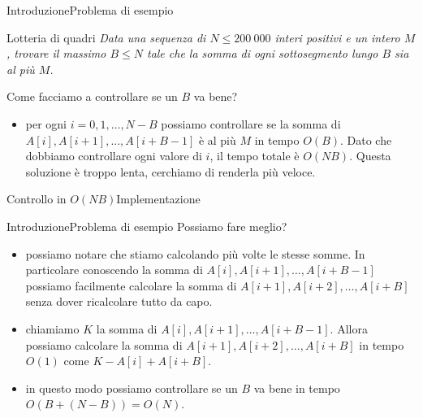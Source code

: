 \documentclass{beamer}
\begin{document}
\begin{frame}[t]{Introduzione}{Problema di esempio}
    \begin{exampleblock}{Lotteria di quadri}
    \textit{Data una sequenza di $N \leq 200 \ 000$ interi positivi e un intero $M$, trovare il massimo $B \leq N$ tale che la somma di ogni sottosegmento lungo $B$ sia al pi\`u $M$.}
    \end{exampleblock}
    \pause
    Come facciamo a controllare se un $B$ va bene?
    \pause
    \begin{itemize}
        \item per ogni $i = 0, 1, \dots, N-B$ possiamo controllare se la somma di $A[i], A[i+1], \dots, A[i+B-1]$ \`e al pi\`u $M$ in tempo $O(B)$.
        Dato che dobbiamo controllare ogni valore di $i$, il tempo totale \`e $O(NB)$. Questa soluzione \`e troppo lenta, cerchiamo di renderla pi\`u veloce.
    \end{itemize}
\end{frame}

\begin{frame}{Controllo in $O(NB)$}{Implementazione}
\end{frame}

\begin{frame}[t]{Introduzione}{Problema di esempio}
    Possiamo fare meglio?
    \pause
    \begin{itemize}
        \item possiamo notare che stiamo calcolando pi\`u volte le stesse somme. In particolare conoscendo la somma di $A[i], A[i+1], \dots, A[i+B-1]$ possiamo
        facilmente calcolare la somma di $A[i+1], A[i+2], \dots, A[i+B]$ senza dover ricalcolare tutto da capo. 
        \pause
        \item chiamiamo $K$ la somma di $A[i], A[i+1], \dots, A[i+B-1]$. Allora possiamo calcolare la somma di $A[i+1], A[i+2], \dots, A[i+B]$ in tempo $O(1)$ come $K - A[i] + A[i+B]$.
        \pause
        \item in questo modo possiamo controllare se un $B$ va bene in tempo $O(B+(N-B))=O(N)$.
    \end{itemize}
\end{frame}
\end{document}
